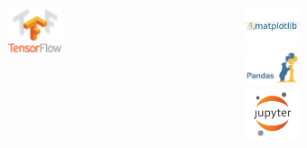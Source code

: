 \documentclass[12pt, aspectratio=169]{beamer}
\begin{document}
{{\begin{columns}
\begin{column}{4cm}
\begin{figure}
      \vspace{1em}
      \hspace{-4em}
   \includegraphics[width=0.38\textwidth]{tensorflow} 
   \end{figure}
   \end{column}
    \begin{column}{4cm}
   \begin{figure}
      \includegraphics[width=0.38\textwidth]{matplot}  \\ 
      \vspace{1em}
      \includegraphics[width=0.38\textwidth]{pandas}  \\ 
      \vspace{1em}
      \includegraphics[width=0.38\textwidth]{jupyter} 
   \end{figure}
   \end{column}
   \end{columns}
 }
 
}
\end{document}
